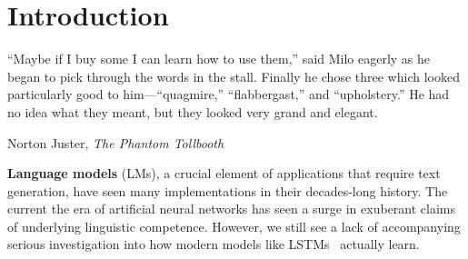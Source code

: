 \chapter{Introduction}





\epigraph{``Maybe if I buy some I can learn how to use them,'' said Milo eagerly as he began to pick through the words in the stall. Finally he chose three which looked particularly good to him---``quagmire,'' ``flabbergast,'' and ``upholstery.'' He had no idea what they meant, but they looked very grand and elegant.
}{Norton Juster, \textit{The Phantom Tollbooth}}



\textbf{Language models} (LMs), a crucial element of applications that require text generation, have seen many implementations in their decades-long history. The current the era of artificial neural networks has seen a surge in exuberant claims of underlying linguistic competence. However, we still see a lack of accompanying serious investigation into how modern models like LSTMs~\citep{hochreiter_long_1997} actually learn.

